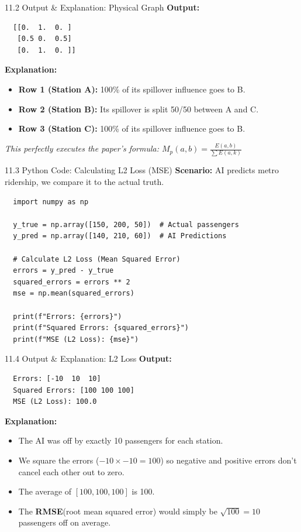 \documentclass[aspectratio=169]{beamer}
\begin{document}
\begin{frame}[fragile]{11.2 Output \& Explanation: Physical Graph}
  \textbf{Output:}
  \begin{verbatim}
  [[0.  1.  0. ]
   [0.5 0.  0.5]
   [0.  1.  0. ]]
  \end{verbatim}
  \textbf{Explanation:}
  \begin{itemize}
      \item \textbf{Row 1 (Station A):} 100\% of its spillover influence goes to B.
      \item \textbf{Row 2 (Station B):} Its spillover is split 50/50 between A and C.
      \item \textbf{Row 3 (Station C):} 100\% of its spillover influence goes to B.
  \end{itemize}
  \textit{This perfectly executes the paper's formula: $M_p(a,b) = \frac{E(a,b)}{\sum E(a,k)}$}
\end{frame}

\begin{frame}[fragile]{11.3 Python Code: Calculating L2 Loss (MSE)}
  \textbf{Scenario:} AI predicts metro ridership, we compare it to the actual truth.
  \begin{verbatim}
  import numpy as np

  y_true = np.array([150, 200, 50])  # Actual passengers
  y_pred = np.array([140, 210, 60])  # AI Predictions

  # Calculate L2 Loss (Mean Squared Error)
  errors = y_pred - y_true
  squared_errors = errors ** 2
  mse = np.mean(squared_errors)

  print(f"Errors: {errors}")
  print(f"Squared Errors: {squared_errors}")
  print(f"MSE (L2 Loss): {mse}")
  \end{verbatim}
\end{frame}

\begin{frame}[fragile]{11.4 Output \& Explanation: L2 Loss}
  \textbf{Output:}
  \begin{verbatim}
  Errors: [-10  10  10]
  Squared Errors: [100 100 100]
  MSE (L2 Loss): 100.0
  \end{verbatim}
  \textbf{Explanation:}
  \begin{itemize}
      \item The AI was off by exactly 10 passengers for each station.
      \item We square the errors ($-10 \times -10 = 100$) so negative and positive errors don't cancel each other out to zero.
      \item The average of $[100, 100, 100]$ is 100. 
      \item The \textbf{RMSE}(root mean squared error) would simply be $\sqrt{100} = 10$ passengers off on average.
  \end{itemize}
\end{frame}
\end{document}
